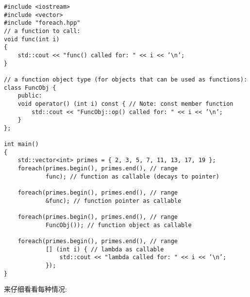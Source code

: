 \begin{lstlisting}[style=styleCXX]
#include <iostream>
#include <vector>
#include "foreach.hpp"
// a function to call:
void func(int i)
{
	std::cout << "func() called for: " << i << ’\n’;
}

// a function object type (for objects that can be used as functions):
class FuncObj {
	public:
	void operator() (int i) const { // Note: const member function
		std::cout << "FuncObj::op() called for: " << i << ’\n’;
	}
};

int main()
{
	std::vector<int> primes = { 2, 3, 5, 7, 11, 13, 17, 19 };
	foreach(primes.begin(), primes.end(), // range
			func); // function as callable (decays to pointer)

	foreach(primes.begin(), primes.end(), // range
			&func); // function pointer as callable

	foreach(primes.begin(), primes.end(), // range
			FuncObj()); // function object as callable

	foreach(primes.begin(), primes.end(), // range
			[] (int i) { // lambda as callable
				std::cout << "lambda called for: " << i << ’\n’;
			});
}
\end{lstlisting}

来仔细看看每种情况:

